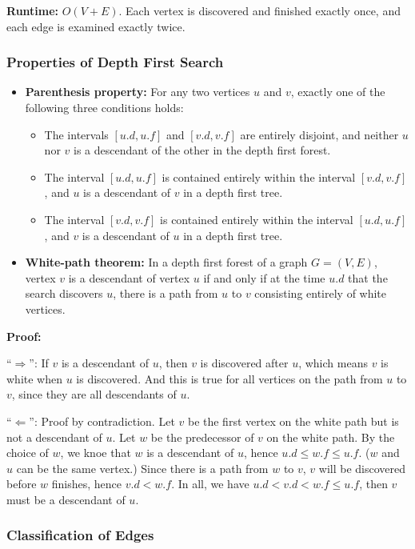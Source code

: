 \documentclass[a4paper,12pt]{article}
\begin{document}
\textbf{Runtime:}
$O(V + E)$.
Each vertex is discovered and finished exactly once, and each edge is examined exactly twice.

\subsubsection{Properties of Depth First Search}

\begin{itemize}
	\item \textbf{Parenthesis property:}
	For any two vertices $u$ and $v$, exactly one of the following three conditions holds:
	\begin{itemize}
		\item The intervals $[u.d, u.f]$ and $[v.d, v.f]$ are entirely disjoint, and neither $u$ nor $v$ is a descendant of the other in the depth first forest.
		\item The interval $[u.d, u.f]$ is contained entirely within the interval $[v.d, v.f]$, and $u$ is a descendant of $v$ in a depth first tree.
		\item The interval $[v.d, v.f]$ is contained entirely within the interval $[u.d, u.f]$, and $v$ is a descendant of $u$ in a depth first tree.
	\end{itemize}
	\item \textbf{White-path theorem:}
	In a depth first forest of a graph $G = (V, E)$, vertex $v$ is a descendant of vertex $u$ if and only if at the time $u.d$ that the search discovers $u$, there is a path from $u$ to $v$ consisting entirely of white vertices.
\end{itemize}

\textbf{Proof:}

``$\Rightarrow$'':
If $v$ is a descendant of $u$, then $v$ is discovered after $u$, which means $v$ is white when $u$ is discovered.
And this is true for all vertices on the path from $u$ to $v$, since they are all descendants of $u$.

``$\Leftarrow$'':
Proof by contradiction.
Let $v$ be the first vertex on the white path but is not a descendant of $u$.
Let $w$ be the predecessor of $v$ on the white path.
By the choice of $w$, we knoe that $w$ is a descendant of $u$, hence $u.d \leq w.f \leq u.f$. ($w$ and $u$ can be the same vertex.)
Since there is a path from $w$ to $v$, $v$ will be discovered before $w$ finishes, hence $v.d < w.f$.
In all, we have $u.d < v.d < w.f \leq u.f$, then $v$ must be a descendant of $u$.

\subsubsection{Classification of Edges}
\end{document}
